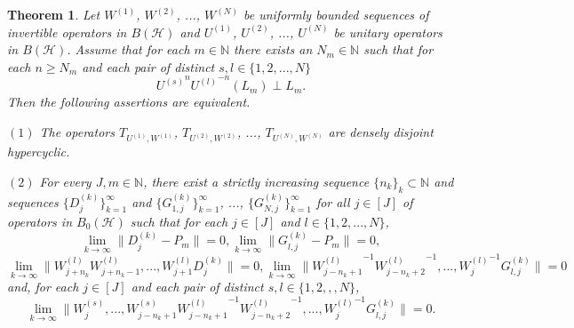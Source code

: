 \documentclass{article}
\newtheorem{theorem}{Theorem}[section]
\begin{document}
\begin{theorem}\label{the5.1}
Let $W^{(1)}$, $W^{(2)}$, ..., $W^{(N)}$ be uniformly bounded sequences of invertible operators in $B(\mathcal{H})$ and $U^{(1)}$, $U^{(2)}$, ..., $U^{(N)}$ be unitary operators in $B(\mathcal{H})$. Assume that for each $m\in \mathbb{N}$ there exists an $N_{m}\in\mathbb{N}$ such that for each $n\geq N_{m}$ and each pair of distinct $s,l\in \{1,2, ..., N\}$
\begin{equation} \label{eq1}
{U^{(s)}}^{n}{U^{(l)}}^{-n}(L_{m})\perp L_{m}\tag{*}.
\end{equation}
Then the following assertions are equivalent.

$(1)$ The operators $T_{U^{(1)},W^{(1)}}$, $T_{U^{(2)},W^{(2)}}$, ..., $T_{U^{(N)},W^{(N)}}$ are densely disjoint hypercyclic.

$(2)$ For every $J,m \in\mathbb{N}$, there exist a strictly increasing sequence $\{n_{k}\}_{k}\subset\mathbb{N}$ and sequences
$\{D^{(k)}_{j}\}^{\infty}_{k=1}$ and $\{G^{(k)}_{1,j}\}^{\infty}_{k=1}$, ..., $\{G^{(k)}_{N,j}\}^{\infty}_{k=1}$
 for all $j\in [J]$ of operators in $B_{0}(\mathcal{H})$ such that for each $ j\in [J]$ and $l\in\{1,2,...,N\}$,
\[\lim_{k\rightarrow\infty}\|D^{(k)}_{j}-P_{m}\|=0, \lim_{k\rightarrow\infty}\|G^{(k)}_{l,j}-P_{m}\|=0,\]
\[\lim_{k\rightarrow\infty}\|W^{(l)}_{j+n_{k}}W^{(l)}_{j+n_{k}-1},...,W^{(l)}_{j+1}D^{(k)}_{j}\|=0,
\lim_{k\rightarrow\infty}\|{W^{(l)}_{j-n_{k}+1}}^{-1}{W^{(l)}_{j-n_{k}+2}}^{-1},...,{W^{(l)}_{j}}^{-1}G^{(k)}_{l,j}\|=0\]
 and, for each $j\in[J]$ and each pair of distinct $s,l\in \{1,2,,,N\}$,
 \[\lim_{k\rightarrow\infty}\|W^{(s)}_{j},...,W^{(s)}_{j-n_{k}+1}{W^{(l)}_{j-n_{k}+1}}^{-1}{W^{(l)}_{j-n_{k}+2}}^{-1},...,
 {W^{(l)}_{j}}^{-1}G^{(k)}_{l,j}\|=0.\]
\end{theorem}
\end{document}
